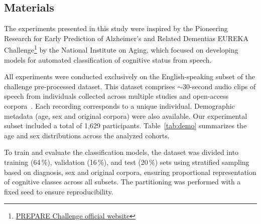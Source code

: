 \documentclass{article}
\begin{document}
{\subsection{Materials}
\label{sssec:subsubhead}








The experiments presented in this study were inspired by the Pioneering Research for Early Prediction of Alzheimer’s and Related Dementias EUREKA Challenge\footnote{\href{https://www.drivendata.org/competitions/299/competition-nih-alzheimers-acoustic-2/page/929/}{PREPARE Challenge official website}} by the National
Institute on Aging, which focused on developing models for automated classification of cognitive status from speech. 

All experiments were conducted exclusively on the English-speaking subset of the challenge pre-processed dataset. This dataset comprises $\sim$30-second audio clips of speech from individuals collected across multiple studies and open-access corpora~\cite{DB}. Each recording corresponds to a unique individual. Demographic metadata (age, sex and original corpora) were also available. Our experimental subset included a total of 1,629 participants. Table~\ref{tab:demo} summarizes the age and sex distributions across the analyzed cohorts.

To train and evaluate the classification models, the dataset was divided into training (64\,\%), validation (16\,\%), and test (20\,\%) sets using stratified sampling based on diagnosis, sex and original corpora, ensuring proportional representation of cognitive classes across all subsets. The partitioning was performed with a fixed seed to ensure reproducibility.

}
\end{document}
